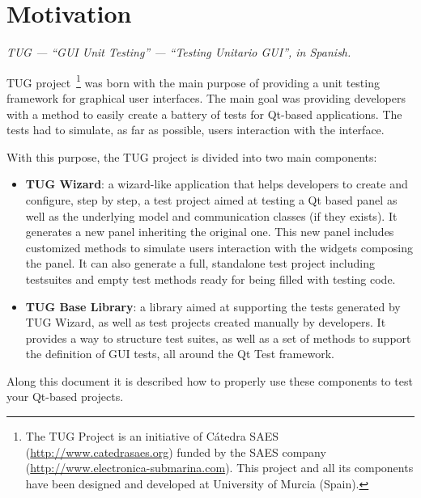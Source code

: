 
\section{Motivation}

\begin{flushright}
{\it TUG --- ``GUI Unit Testing'' --- ``Testing Unitario GUI'', in Spanish.}
\end{flushright}

TUG project~\footnote{The TUG Project is an initiative of C\'atedra
  SAES (\url{http://www.catedrasaes.org}) funded by the SAES company
  (\url{http://www.electronica-submarina.com}). This project and all
  its components have been designed and developed at University of
  Murcia (Spain).}
%
was born with the main purpose of providing a unit testing framework
for graphical user interfaces. The main goal was providing developers
with a method to easily create a battery of tests for Qt-based
applications. The tests had to simulate, as far as possible, users
interaction with the interface.

With this purpose, the TUG project is divided into two main components:
\begin{itemize}
%
\item {\bf TUG Wizard}: a wizard-like application that helps developers to
  create and configure, step by step, a test project aimed at testing a Qt
  based panel as well as the underlying model and communication classes (if
  they exists). It generates a new panel inheriting the original one. This
  new panel includes customized methods to simulate users interaction with
  the widgets composing the panel. It can also generate a full, standalone
  test project including testsuites and empty test methods ready for being
  filled with testing code.
%
\item {\bf TUG Base Library}: a library aimed at supporting the tests
  generated by TUG Wizard, as well as test projects created manually by
  developers. It provides a way to structure test suites, as well as a set
  of methods to support the definition of GUI tests, all around the Qt
  Test framework.
%
\end{itemize}

Along this document it is described how to properly use these
components to test your Qt-based projects.

